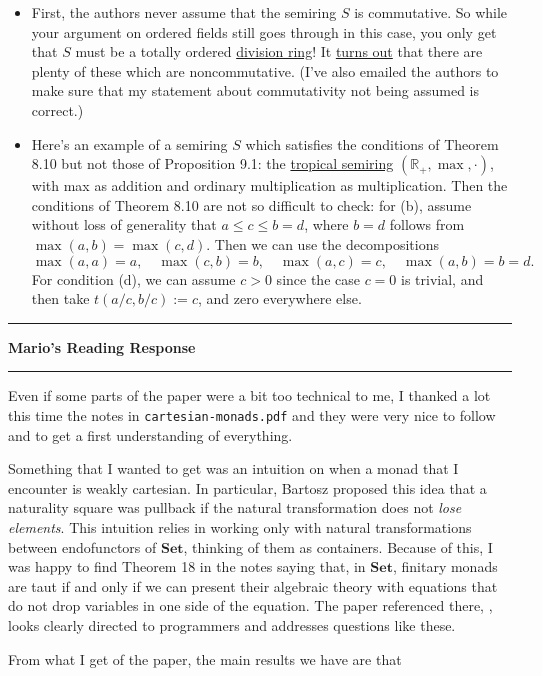 \documentclass{amsart}
\newcommand{\iam}[1]{
  \vspace{0.25em}
  \hrule
  \vspace{0.25em}
  \textbf{{#1}'s Reading Response}
  \vspace{0.25em}
  \hrule
  \vspace{1em}
}
\begin{document}
\begin{itemize}
  \item First, the authors never assume that the semiring $S$ is commutative. So while your argument on ordered fields still goes through in this case, you only get that $S$ must be a totally ordered \href{https://en.wikipedia.org/wiki/Division_ring}{division ring}! It \href{https://www.jstor.org/stable/1990552}{turns out} that there are plenty of these which are noncommutative. (I've also emailed the authors to make sure that my statement about commutativity not being assumed is correct.)
  \item Here's an example of a semiring $S$ which satisfies the conditions of Theorem 8.10 but not those of Proposition 9.1: the \href{https://en.wikipedia.org/wiki/Tropical_semiring}{tropical semiring} $(\mathbb{R}_+,\max,\cdot)$, with max as addition and ordinary multiplication as multiplication. Then the conditions of Theorem 8.10 are not so difficult to check: for (b), assume without loss of generality that $a \leq c \leq b = d$, where $b = d$ follows from $\max(a,b) = \max(c,d)$. Then we can use the decompositions
    \[
      \max(a,a) = a, \quad \max(c,b) = b, \quad \max(a,c) = c, \quad \max(a,b) = b = d.
    \]
    For condition (d), we can assume $c > 0$ since the case $c = 0$ is trivial, and then take $t(a/c,b/c) := c$, and zero everywhere else.
\end{itemize}


\iam{Mario}

Even if some parts of the paper were a bit too technical to me, I
thanked a lot this time the notes in \texttt{cartesian-monads.pdf} and
they were very nice to follow and to get a first understanding of
everything.

Something that I wanted to get was an intuition on when a monad that I
encounter is weakly cartesian.  In particular, Bartosz proposed this
idea that a naturality square was pullback if the natural
transformation does not \textit{lose elements}.  This intuition relies
in working only with natural transformations between endofunctors of
$\mathbf{Set}$, thinking of them as containers.  Because of this, I
was happy to find Theorem 18 in the notes saying that, in
$\mathbf{Set}$, finitary monads are taut if and only if we can present
their algebraic theory with equations that do not drop variables in
one side of the equation.  The paper referenced there, \cite{manesCollection}, looks
clearly directed to programmers and addresses questions like these.

From what I get of the paper, the main results we have are that
\end{document}
